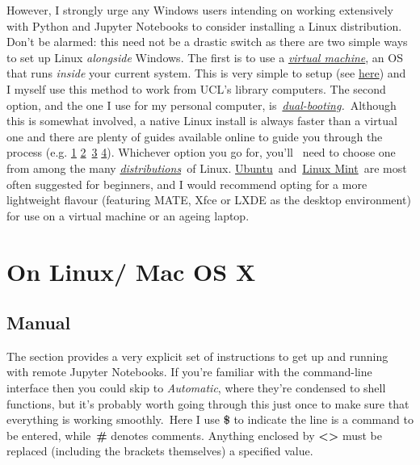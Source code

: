\documentclass[a4paper]{article}
\begin{document}
However, I strongly urge any Windows users intending on working extensively with Python and Jupyter Notebooks to consider installing a Linux distribution.
Don't be alarmed: this need not be a drastic switch as there are two simple ways to set up Linux \emph{alongside} Windows.
The first is to use a \emph{\href{https://www.howtogeek.com/196060/beginner-geek-how-to-create-and-use-virtual-machines/}{virtual machine}}, an OS that runs \emph{inside} your current system.
This is very simple to setup (see \href{http://www.storagecraft.com/blog/the-dead-simple-guide-to-installing-a-linux-virtual-machine-on-windows/}{here}) and I myself use this method to work from UCL's library computers.
The second option, and the one I use for my personal computer, is~\emph{\href{https://www.howtogeek.com/187789/dual-booting-explained-how-you-can-have-multiple-operating-systems-on-your-computer/}{dual-booting}.}~Although this is somewhat involved, a native Linux install is always faster than a virtual one and there are plenty of guides available online to guide you through the process (e.g. \href{https://itsfoss.com/guide-install-linux-mint-16-dual-boot-windows/}{1} \href{https://www.lifewire.com/ultimate-windows-7-ubuntu-linux-dual-boot-guide-2200653}{2}~\href{https://www.howtogeek.com/214571/how-to-dual-boot-linux-on-your-pc/}{3} \href{http://www.pcworld.com/article/2955460/operating-systems/dual-booting-linux-with-windows-what-you-need-to-know.html}{4}). 
Whichever option you go for, you'll ~need to choose one from among the many \emph{\href{http://distrowatch.com/dwres.php?resource=major}{distributions}~}of Linux.
\href{https://www.ubuntu.com/download}{Ubuntu}~and~\href{https://linuxmint.com/}{Linux Mint}~are most often suggested for beginners, and I would recommend opting for a more lightweight flavour (featuring MATE, Xfce or LXDE as the desktop environment) for use on a virtual machine or an ageing laptop.

\section{On Linux/ Mac OS X}
\subsection{Manual}

The section provides a very explicit set of instructions to get up and running with remote Jupyter Notebooks.
If you're familiar with the command-line interface then you could skip to \emph{Automatic}, where they're condensed to shell functions, but it's probably worth going through this just once to make sure that everything is working smoothly.~Here I use \textbf{\$} to indicate the line is a command to be entered, while~\textbf{\#} denotes comments.
Anything enclosed by \textbf{\textless{}\textgreater{}} must be replaced (including the brackets themselves) a specified value.
\end{document}
